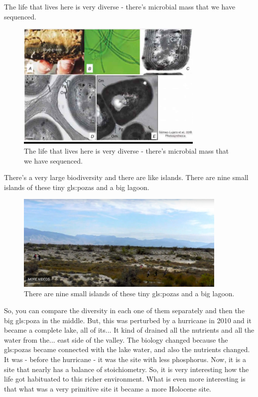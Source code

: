 \documentclass[]{article}
\begin{document}
The life that lives here is very diverse - there's microbial mass that we have sequenced.

\begin{figure}[H]
	\caption[The life that lives here is very diverse]{The life that lives here is very diverse - there's microbial mass that we have sequenced.}\label{fig:PosasBiodiversity}
	\includegraphics[width=0.8\textwidth]{PosasBiodiversity}
\end{figure}

There's a very large biodiversity and there are like islands. There are nine small islands of these tiny \gls{gls:poza}s and a big lagoon.

\begin{figure}[H]
	\caption{There are nine small islands of these tiny \gls{gls:poza}s and a big lagoon.} 
	\includegraphics[width=0.9\textwidth]{CuatroCienegas7}
\end{figure}

So, you can compare the diversity in each one of them separately and then the big \gls{gls:poza} in the middle. But, this was perturbed by a hurricane in 2010 and it became a complete lake, all of its... It kind of drained all the nutrients and all the water from the... east side of the valley. The biology changed because the \gls{gls:poza}s became connected 
with the lake water, and also the nutrients changed. It was - before the hurricane - it was the site with less phosphorus. Now, it is a site that nearly has a balance of stoichiometry. So, it is very interesting how the life got habituated to this richer environment. What is even more interesting is that what was a very primitive site it became a more Holocene site.
\end{document}
